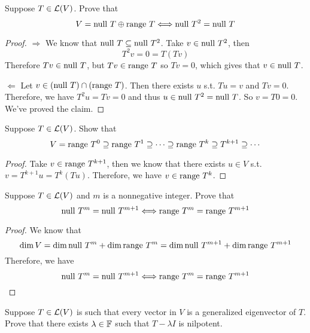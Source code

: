 \documentclass{extarticle}
\begin{document}
\begin{problem}{3}
    Suppose \(T \in \mathcal{L}(V)\). Prove that 
    \[V = \text{null } T \oplus \text{range } T \Longleftrightarrow \text{null } T^2 = \text{null } T\]
\end{problem}

\begin{proof}
\(\Rightarrow\) We know that \(\text{null } T \subseteq \text{null } T^2\). Take \(v \in \text{null } T^2\), then 
\[T^2 v = 0 = T(Tv)\]
Therefore \(Tv \in \text{null } T\), but \(Tv \in \text{range } T\) so \(Tv = 0\), which gives that 
\(v \in \text{null } T\).

\(\Leftarrow\) Let \(v \in (\text{null } T) \cap (\text{range } T)\). Then there exists \(u\) s.t. 
\(Tu = v\) and \(Tv = 0\). Therefore, we have \(T^2u = Tv = 0\) and thus \(u \in \text{null } T^2 
=\text{null } T\). So \(v = T0  = 0\). We've proved the claim.
\end{proof}

\begin{problem}{6}
    Suppose \(T \in \mathcal{L}(V)\). Show that 
    \[V = \text{range } T^0 \supseteq \text{range } T^1 \supseteq \cdots \supseteq \text{range } T^k \supseteq T^{k+1} \supseteq \cdots\]
\end{problem}

\begin{proof}
Take \(v \in \text{range } T^{k+1}\), then we know that there exists \(u \in V\) s.t. 
\(v = T^{k+1} u = T^{k}(Tu)\). Therefore, we have \(v \in \text{range } T^k\). 
\end{proof}

\begin{problem}{9}
    Suppose \(T \in \mathcal{L}(V)\) and \(m\) is a nonnegative integer. Prove that 
    \[\text{null } T^m = \text{null } T^{m+1} \Longleftrightarrow \text{range } T^m = \text{range } T^{m+1}\]
\end{problem}

\begin{proof}
We know that 
\[\dim V = \dim \text{null } T^m + \dim \text{range } T^m = \dim \text{null } T^{m+1} + \dim \text{range } T^{m+1}\]
Therefore, we have
\[\text{null } T^m = \text{null } T^{m+1} \Longleftrightarrow \text{range } T^m = \text{range } T^{m+1}\]
\end{proof}

\begin{problem}{12}
    Suppose \(T \in \mathcal{L}(V)\) is such that every vector in \(V\) is a generalized eigenvector of \(T\). 
    Prove that there exists \(\lambda \in \mathbb{F}\) such that \(T - \lambda I\) is nilpotent.
\end{problem}
\end{document}
